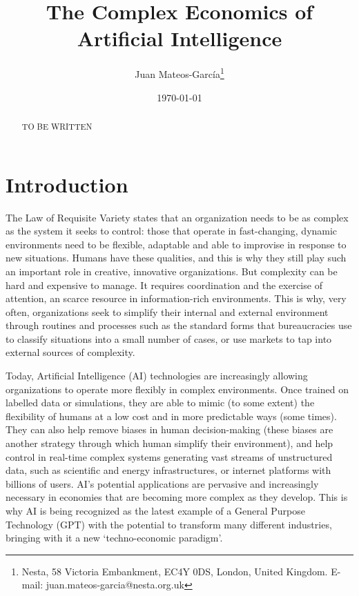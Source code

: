 \documentclass[11pt]{article}
\begin{document}
\begin{titlepage}
\title{The Complex Economics of Artificial Intelligence}
\author{Juan Mateos-Garc\'{i}a\thanks{Nesta, 58 Victoria Embankment, EC4Y 0DS, London, United Kingdom. E-mail: juan.mateos-garcia@nesta.org.uk}}
\date{\today}
\maketitle
\begin{abstract}
\noindent TO BE WRITTEN
\bigskip
\end{abstract}

\setcounter{page}{0}
\thispagestyle{empty}
\end{titlepage}

\section{Introduction}
The Law of Requisite Variety states that an organization needs to be as complex as the system it seeks to control: those that operate in fast-changing, dynamic environments need to be flexible, adaptable and able to improvise in response to new situations. Humans have these qualities, and this is why they still play such an important role in creative, innovative organizations. But complexity can be hard and expensive to manage. It requires coordination and the exercise of attention, an scarce resource in information-rich environments. This is why, very often, organizations seek to simplify their internal and external environment through routines and processes such as the standard forms that bureaucracies use to classify situations into a small number of cases, or use markets to tap into external sources of complexity. 

Today, Artificial Intelligence (AI) technologies are increasingly allowing organizations to operate more flexibly in complex environments. Once trained on labelled data or simulations, they are able to mimic (to some extent) the flexibility of humans at a low cost and in more predictable ways (some times). They can also help remove biases in human decision-making (these biases are another strategy through which human simplify their environment), and help control in real-time complex systems generating vast streams of unstructured data, such as scientific and energy infrastructures, or internet platforms with billions of users. AI's potential applications are pervasive and increasingly necessary in economies that are becoming more complex as they develop. This is why AI is being recognized as the latest example of a General Purpose Technology (GPT) with the potential to transform many different industries, bringing with it a new `techno-economic paradigm'. 
\end{document}

